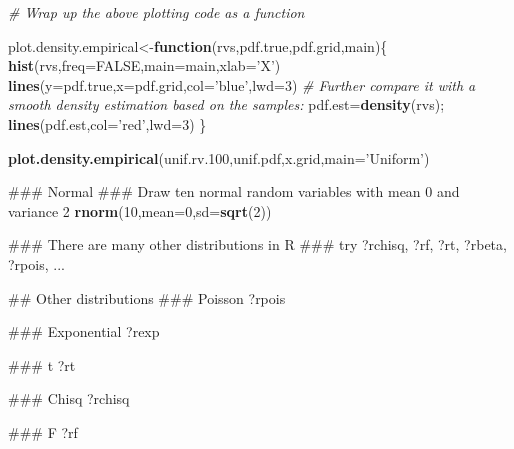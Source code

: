 \documentclass[12pt,]{book}
\newenvironment{Shaded}{\begin{snugshade}}{\end{snugshade}}
\newcommand{\KeywordTok}[1]{\textcolor[rgb]{0.13,0.29,0.53}{\textbf{#1}}}
\newcommand{\DataTypeTok}[1]{\textcolor[rgb]{0.13,0.29,0.53}{#1}}
\newcommand{\DecValTok}[1]{\textcolor[rgb]{0.00,0.00,0.81}{#1}}
\newcommand{\StringTok}[1]{\textcolor[rgb]{0.31,0.60,0.02}{#1}}
\newcommand{\CommentTok}[1]{\textcolor[rgb]{0.56,0.35,0.01}{\textit{#1}}}
\newcommand{\OtherTok}[1]{\textcolor[rgb]{0.56,0.35,0.01}{#1}}
\newcommand{\ControlFlowTok}[1]{\textcolor[rgb]{0.13,0.29,0.53}{\textbf{#1}}}
\newcommand{\NormalTok}[1]{#1}
\begin{document}
\begin{Shaded}
\begin{Highlighting}[]
\CommentTok{# Wrap up the above plotting code as a function }

\NormalTok{plot.density.empirical<-}\ControlFlowTok{function}\NormalTok{(rvs,pdf.true,pdf.grid,main)\{}
\KeywordTok{hist}\NormalTok{(rvs,}\DataTypeTok{freq=}\OtherTok{FALSE}\NormalTok{,}\DataTypeTok{main=}\NormalTok{main,}\DataTypeTok{xlab=}\StringTok{'X'}\NormalTok{)}
\KeywordTok{lines}\NormalTok{(}\DataTypeTok{y=}\NormalTok{pdf.true,}\DataTypeTok{x=}\NormalTok{pdf.grid,}\DataTypeTok{col=}\StringTok{'blue'}\NormalTok{,}\DataTypeTok{lwd=}\DecValTok{3}\NormalTok{)}
\CommentTok{# Further compare it with a smooth density estimation based on the samples:}
\NormalTok{pdf.est=}\KeywordTok{density}\NormalTok{(rvs);}
\KeywordTok{lines}\NormalTok{(pdf.est,}\DataTypeTok{col=}\StringTok{'red'}\NormalTok{,}\DataTypeTok{lwd=}\DecValTok{3}\NormalTok{)}
\NormalTok{\}}


\KeywordTok{plot.density.empirical}\NormalTok{(unif.rv.}\DecValTok{100}\NormalTok{,unif.pdf,x.grid,}\DataTypeTok{main=}\StringTok{'Uniform'}\NormalTok{)}
\end{Highlighting}
\end{Shaded}

\begin{Shaded}
\begin{Highlighting}[]
\NormalTok{### Normal}
\NormalTok{### Draw ten normal random variables with mean 0 and variance 2}
\KeywordTok{rnorm}\NormalTok{(}\DecValTok{10}\NormalTok{,}\DataTypeTok{mean=}\DecValTok{0}\NormalTok{,}\DataTypeTok{sd=}\KeywordTok{sqrt}\NormalTok{(}\DecValTok{2}\NormalTok{))}

\NormalTok{### There are many other distributions in R}
\NormalTok{### try ?rchisq, ?rf, ?rt, ?rbeta, ?rpois, ...}
\end{Highlighting}
\end{Shaded}

\begin{Shaded}
\begin{Highlighting}[]
\NormalTok{## Other distributions}
\NormalTok{### Poisson  ?rpois}

\NormalTok{### Exponential ?rexp}

\NormalTok{### t ?rt}


\NormalTok{### Chisq ?rchisq}


\NormalTok{### F ?rf}
\end{Highlighting}
\end{Shaded}
\end{document}
